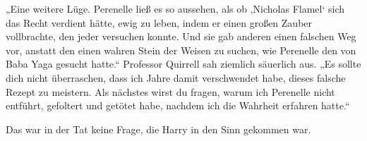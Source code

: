 „Eine weitere Lüge. Perenelle ließ es so aussehen, als ob ‚Nicholas Flamel‘ sich das Recht verdient hätte, ewig zu leben, indem er einen großen Zauber vollbrachte, den jeder versuchen konnte. Und sie gab anderen einen falschen Weg vor, anstatt den einen wahren Stein der Weisen zu suchen, wie Perenelle den von Baba Yaga gesucht hatte.“
Professor Quirrell sah ziemlich säuerlich aus.
„Es sollte dich nicht überraschen, dass ich Jahre damit verschwendet habe, dieses falsche Rezept zu meistern. Als nächstes wirst du fragen, warum ich Perenelle nicht entführt, gefoltert und getötet habe, nachdem ich die Wahrheit erfahren hatte.“

Das war in der Tat keine Frage, die Harry in den Sinn gekommen war.


